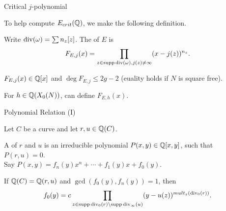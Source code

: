 \documentclass[handout]{beamer}
\begin{document}
\begin{frame}{Critical $j$-polynomial}





To help compute $E_{crit}(\mathbb{Q})$, we make the following definition. 
\begin{Def}
Write $\operatorname{div}(\omega) = \sum n_z[z]$. The  of $E$ is 
\[
F_{E,j}(x) = \prod_{z \in \operatorname{supp} \operatorname{div}(\omega), j(z) \neq \infty}(x-j(z))^{n_z}.
\]
\end{Def}
$F_{E,j}(x) \in \mathbb{Q}[x]$ and $\deg F_{E,j} \leq 2g-2$ (euality holds if $N$ is square free). 

\pause
\smallskip

For $h \in \mathbb{Q}(X_0(N))$, can define $F_{E,h}(x)$. 


\end{frame}


\begin{frame}{Polynomial Relation (I)}

Let $C$ be a curve and let $r, u \in \mathbb{Q}(C)$. 

A  of $r$ and $u$ is an irreducible polynomial $P(x,y) \in \mathbb{Q}[x,y]$, such that $P(r,u) = 0$.  \\

Say $P(x,y) = f_n(y)x^n + \cdots + f_1(y)x + f_0(y)$. 


\begin{Lemma}[C.]
\label{mult}
If $\mathbb{Q}(C) = \mathbb{Q}(r,u)$ and $\gcd(f_0(y), f_n(y)) = 1$, then 
\[
		f_0(y) = c \prod_{z \in \operatorname{supp} \operatorname{div}_{0}(r) \setminus  \operatorname{supp} \operatorname{div}_{\infty}(u)} (y - u(z))^{mult_z(\operatorname{div}_0(r))}.
\]
\end{Lemma}


\end{frame}
\end{document}
